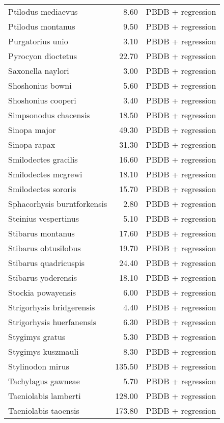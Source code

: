 \begin{table}[ht]
\begin{tabular}{lrl}
  Ptilodus mediaevus & 8.60 & PBDB + regression \\ 
  Ptilodus montanus & 9.50 & PBDB + regression \\ 
  Purgatorius unio & 3.10 & PBDB + regression \\ 
  Pyrocyon dioctetus & 22.70 & PBDB + regression \\ 
  Saxonella naylori & 3.00 & PBDB + regression \\ 
  Shoshonius bowni & 5.60 & PBDB + regression \\ 
  Shoshonius cooperi & 3.40 & PBDB + regression \\ 
  Simpsonodus chacensis & 18.50 & PBDB + regression \\ 
  Sinopa major & 49.30 & PBDB + regression \\ 
  Sinopa rapax & 31.30 & PBDB + regression \\ 
  Smilodectes gracilis & 16.60 & PBDB + regression \\ 
  Smilodectes mcgrewi & 18.10 & PBDB + regression \\ 
  Smilodectes sororis & 15.70 & PBDB + regression \\ 
  Sphacorhysis burntforkensis & 2.80 & PBDB + regression \\ 
  Steinius vespertinus & 5.10 & PBDB + regression \\ 
  Stibarus montanus & 17.60 & PBDB + regression \\ 
  Stibarus obtusilobus & 19.70 & PBDB + regression \\ 
  Stibarus quadricuspis & 24.40 & PBDB + regression \\ 
  Stibarus yoderensis & 18.10 & PBDB + regression \\ 
  Stockia powayensis & 6.00 & PBDB + regression \\ 
  Strigorhysis bridgerensis & 4.40 & PBDB + regression \\ 
  Strigorhysis huerfanensis & 6.30 & PBDB + regression \\ 
  Stygimys gratus & 5.30 & PBDB + regression \\ 
  Stygimys kuszmauli & 8.30 & PBDB + regression \\ 
  Stylinodon mirus & 135.50 & PBDB + regression \\ 
  Tachylagus gawneae & 5.70 & PBDB + regression \\ 
  Taeniolabis lamberti & 128.00 & PBDB + regression \\ 
  Taeniolabis taoensis & 173.80 & PBDB + regression \\ 

\end{tabular}
\end{table}
